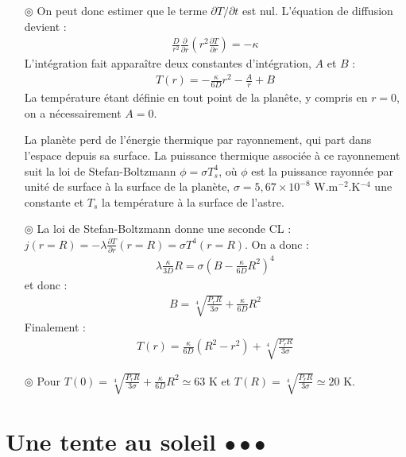\documentclass{report}
\begin{document}
\begin{itemize}
	\item[$\circledcirc$] On peut donc estimer que le terme $\partial T/\partial t$ est nul. L'équation de diffusion devient :
	\begin{align*}
		\frac{D}{r^2}\frac{\partial }{\partial r}\left( r^2\frac{\partial T}{\partial r}\right) =  -\kappa		
	\end{align*}
	L'intégration fait apparaître deux constantes d'intégration, $A$ et $B$ :
	\begin{align*}
		T(r) = -\frac{\kappa}{6D}r^2-\frac{A}{r}+B
	\end{align*}
	La température étant définie en tout point de la planête, y compris en $r=0$, on a nécessairement $A=0$. 

	 La planète perd de l'énergie thermique par rayonnement, qui part dans l'espace depuis sa surface. La puissance thermique associée à ce rayonnement suit la loi de Stefan-Boltzmann $\phi=\sigma T_s^4$, où $\phi$ est la puissance rayonnée par unité de surface à la surface de la planète, $\sigma=5,67\times10^{-8}$ W.m$^{-2}$.K$^{-4}$ une constante et $T_s$ la température à la surface de l'astre.

	 \item[$\circledcirc$] La loi de Stefan-Boltzmann donne une seconde CL : $j(r=R)=-\lambda\frac{\partial T}{\partial r}(r=R)=\sigma T^4(r=R)$. On a donc :
	 \begin{align*}
	 	\lambda\frac{\kappa}{3D}R=\sigma\left(B-\frac{\kappa}{6D}R^2\right)^4
	 \end{align*}
	 et donc :
	 \begin{align*}
	 	B = \sqrt[4]{\frac{P_r R}{3\sigma}}+\frac{\kappa}{6D}R^2
	 \end{align*}
	 Finalement :
	 \begin{align*}
	 	T(r) = \frac{\kappa}{6D}\left( R^2 - r^2\right) +\sqrt[4]{\frac{P_r R}{3\sigma}}
	 \end{align*}
	 
	 \item[$\circledcirc$] Pour $T(0)=\sqrt[4]{\frac{P_r R}{3\sigma}}+\frac{\kappa}{6D}R^2\simeq63$ K et $T(R)=\sqrt[4]{\frac{P_r R}{3\sigma}}\simeq 20$ K.

\end{itemize}	

\newpage

\section*{Une tente au soleil $\bullet\bullet\bullet$}
\end{document}
